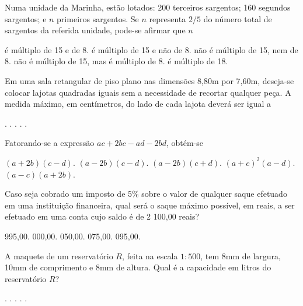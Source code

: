 \begin{question}%
Numa unidade da Marinha, estão lotados: 200 terceiros sargentos; 160 segundos sargentos; e \(n\) primeiros sargentos. Se \(n\) representa \(2/5\) do número total de sargentos da referida unidade, pode-se afirmar que \(n\)
    \begin{tasks}
        \task é múltiplo de 15 e de 8.
        \task é múltiplo de 15 e não de 8.
        \task não é múltiplo de 15, nem de 8.
        \task não é múltiplo de 15, mas é múltiplo de 8.
        \task é múltiplo de 18.
    \end{tasks}
\end{question}

\begin{question}%
Em uma sala retangular de piso plano nas dimensões 8,80m por 7,60m, deseja-se colocar lajotas quadradas iguais sem a necessidade de recortar qualquer peça. A medida máximo, em centímetros, do lado de cada lajota deverá ser igual a
    \begin{tasks}
        .
        .
        .
        .
        .
    \end{tasks}
\end{question}

\begin{question}%
Fatorando-se a expressão \(ac + 2bc - ad -2bd\), obtém-se
    \begin{tasks}
        \task \((a+2b)(c-d)\).
        \task \((a-2b)(c-d)\).
        \task \((a-2b)(c+d)\).
        \task \((a+c)^2(a-d)\).
        \task \((a-c)(a+2b)\).
    \end{tasks}
\end{question}

\begin{question}%
Caso seja cobrado um imposto de 5\% sobre o valor de qualquer saque efetuado em uma instituição financeira, qual será o saque máximo possível, em reais, a ser efetuado em uma conta cujo saldo é de 2 100,00 reais?
    \begin{tasks}
         995,00.
         000,00.
         050,00.
         075,00.
         095,00.
    \end{tasks}
\end{question}

\begin{question}%
A maquete de um reservatório \(R\), feita na escala \(1:500\), tem 8mm de largura, 10mm de comprimento e 8mm de altura. Qual é a capacidade em litros do reservatório \(R\)?
    \begin{tasks}
        .
        .
        .
        .
        .
    \end{tasks}
\end{question}

